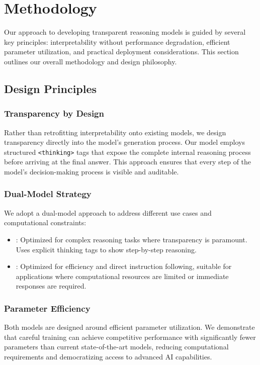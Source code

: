 \section{Methodology}
\label{sec:methodology}

Our approach to developing transparent reasoning models is guided by several key principles: interpretability without performance degradation, efficient parameter utilization, and practical deployment considerations. This section outlines our overall methodology and design philosophy.

\subsection{Design Principles}

\subsubsection{Transparency by Design}
Rather than retrofitting interpretability onto existing models, we design transparency directly into the model's generation process. Our \supra{} model employs structured \texttt{<thinking>} tags that expose the complete internal reasoning process before arriving at the final answer. This approach ensures that every step of the model's decision-making process is visible and auditable.

\subsubsection{Dual-Model Strategy}
We adopt a dual-model approach to address different use cases and computational constraints:

\begin{itemize}
    \item \textbf{\supra{}}: Optimized for complex reasoning tasks where transparency is paramount. Uses explicit thinking tags to show step-by-step reasoning.
    \item \textbf{\zennano{}}: Optimized for efficiency and direct instruction following, suitable for applications where computational resources are limited or immediate responses are required.
\end{itemize}

\subsubsection{Parameter Efficiency}
Both models are designed around efficient parameter utilization. We demonstrate that careful training can achieve competitive performance with significantly fewer parameters than current state-of-the-art models, reducing computational requirements and democratizing access to advanced AI capabilities.

